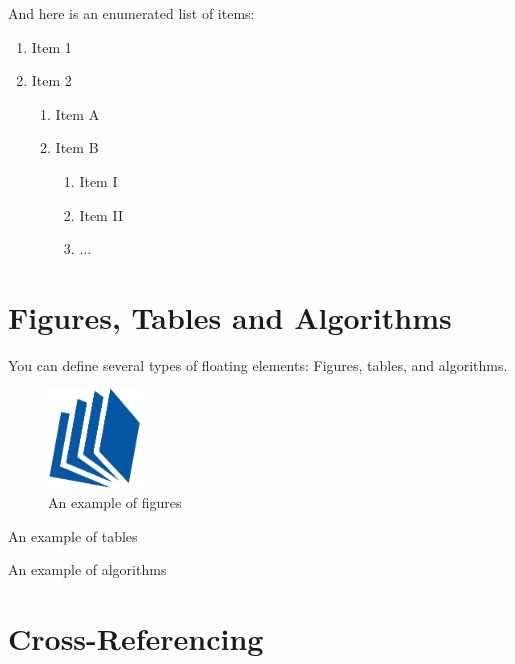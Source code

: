 \noindent
And here is an enumerated list of items:

\begin{enumerate}
	\item Item 1	
	\item Item 2
	\begin{enumerate}
		\item Item A
		\item Item B
		\begin{enumerate}
			\item Item I
			\item Item II
			\item ...
		\end{enumerate}
	\end{enumerate}
\end{enumerate}

\section{Figures, Tables and Algorithms}
You can define several types of floating elements: Figures, tables, and algorithms.

\begin{figure}[h]
	\centering
	\includegraphics[width=2.5cm]{figures/example}
	\caption{An example of figures}
	\label{fig:example} %
\end{figure}

\begin{table}[h]
	\centering
	\caption{An example of tables}
	
	\label{tab:example} %
\end{table}

\begin{algorithm}[h] 
	
	\caption{An example of algorithms}
	\label{algo:example} %
\end{algorithm}

\section{Cross-Referencing}

